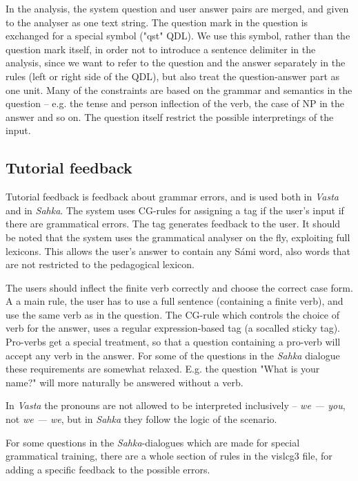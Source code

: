 \documentclass[11pt]{article}
\begin{document}
In the analysis, the system question and user answer pairs are merged, and given to the analyser as one text string. The question mark in the question is exchanged for a special symbol ("qst" QDL). We use this symbol, rather than the question mark itself, in order not to introduce a sentence delimiter in the analysis, since we want to refer to the question and the answer separately in the rules (left or right side of the QDL), but also treat the question-answer part as one unit. Many of the constraints are based on the grammar and semantics in the question -- e.g. the tense and person inflection of the verb, the case of NP in the answer and so on. The question itself restrict the possible interpretings of the input.

\subsection{Tutorial feedback}
Tutorial feedback is feedback about grammar errors, and is used both in \textit{Vasta} and in \textit{Sahka}. The system uses CG-rules for assigning a tag if the user's input if there are grammatical errors. The tag generates feedback to the user. It should be noted that the system uses the grammatical analyser on the fly, exploiting full lexicons. This allows the user's answer to contain any Sámi word, also words that are not restricted to the pedagogical lexicon.

The users should inflect the finite verb correctly and choose the correct case form. A a main rule, the user has to use a full sentence (containing a finite verb), and use the same verb as in the question. The CG-rule which controls the choice of verb for the answer, uses a regular expression-based tag (a socalled sticky tag). Pro-verbs get a special treatment, so that a question containing a pro-verb will accept any verb in the answer. For some of the questions in the \textit{Sahka} dialogue these requirements are somewhat relaxed. E.g. the question "What is your name?" will more naturally be answered without a verb. 

In \textit{Vasta} the pronouns are not allowed to be interpreted inclusively -- \textit{we — you}, not \textit{we — we}, but in \textit{Sahka} they follow the logic of the scenario.

For some questions in the \textit{Sahka}-dialogues which are made for special grammatical training, there are a whole section of rules in the vislcg3 file, for adding a specific feedback to the possible errors.
\end{document}
